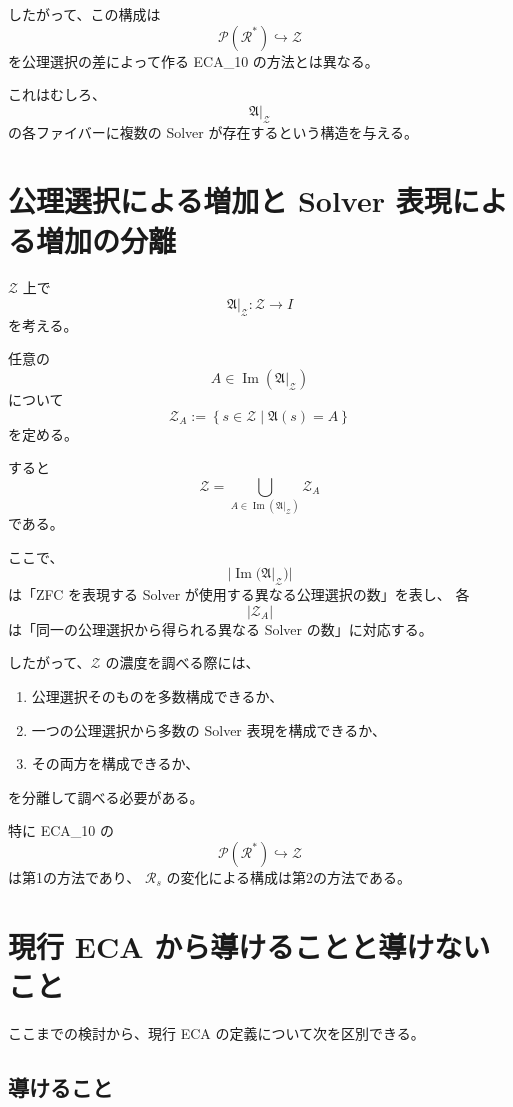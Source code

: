 \documentclass[a4paper,11pt]{article}
\newcommand{\Sel}{I}
\begin{document}
したがって、この構成は
\[
\mathcal{P}(\mathcal{R}^{*})\hookrightarrow\mathcal{Z}
\]
を公理選択の差によって作る ECA_10 の方法とは異なる。

これはむしろ、
\[
\mathfrak{A}|_{\mathcal{Z}}
\]
の各ファイバーに複数の Solver が存在するという構造を与える。

\section{公理選択による増加と Solver 表現による増加の分離}

$\mathcal{Z}$ 上で
\[
\mathfrak{A}|_{\mathcal{Z}}:
\mathcal{Z}\longrightarrow\Sel
\]
を考える。

任意の
\[
A\in\operatorname{Im}(\mathfrak{A}|_{\mathcal{Z}})
\]
について
\[
\mathcal{Z}_A
:=
\left\{
s\in\mathcal{Z}
\mid
\mathfrak{A}(s)=A
\right\}
\]
を定める。

すると
\[
\mathcal{Z}
=
\bigcup_{A\in\operatorname{Im}(\mathfrak{A}|_{\mathcal{Z}})}
\mathcal{Z}_A
\]
である。

ここで、
\[
|\operatorname{Im}(\mathfrak{A}|_{\mathcal{Z}})|
\]
は「ZFC を表現する Solver が使用する異なる公理選択の数」を表し、
各
\[
|\mathcal{Z}_A|
\]
は「同一の公理選択から得られる異なる Solver の数」に対応する。

したがって、$\mathcal{Z}$ の濃度を調べる際には、

\begin{enumerate}
\item 公理選択そのものを多数構成できるか、
\item 一つの公理選択から多数の Solver 表現を構成できるか、
\item その両方を構成できるか、
\end{enumerate}

を分離して調べる必要がある。

特に ECA_10 の
\[
\mathcal{P}(\mathcal{R}^{*})\hookrightarrow\mathcal{Z}
\]
は第1の方法であり、
$\mathcal{R}_s$ の変化による構成は第2の方法である。

\section{現行 ECA から導けることと導けないこと}

ここまでの検討から、現行 ECA の定義について次を区別できる。

\subsection{導けること}
\end{document}
